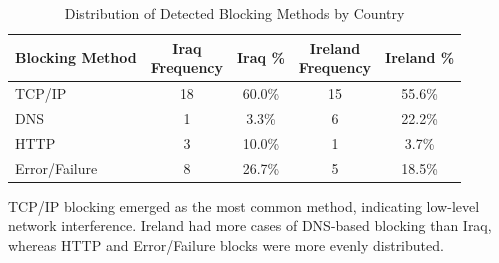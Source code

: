 \vspace{2em}

\begin{table}[H] 
\centering 
\caption{Distribution of Detected Blocking Methods by Country} 
\begin{tabular}{lcccc} 
\toprule 
\textbf{Blocking Method} & \shortstack{\textbf{Iraq} \\ \textbf{Frequency}} & \textbf{Iraq \%} & \shortstack{\textbf{Ireland} \\ \textbf{Frequency}} & \textbf{Ireland \%} \\
\midrule 
TCP/IP         & 18 & 60.0\%  & 15 & 55.6\% \\
DNS            & 1  & 3.3\%   & 6  & 22.2\% \\
HTTP           & 3  & 10.0\%  & 1  & 3.7\% \\
Error/Failure  & 8  & 26.7\%  & 5  & 18.5\% \\
\bottomrule 
\end{tabular} 
\label{tab:blocking_methods_comparison} 
\end{table}

TCP/IP blocking emerged as the most common method, indicating low-level network interference. Ireland had more cases of DNS-based blocking than Iraq, whereas HTTP and Error/Failure blocks were more evenly distributed.

\vspace{2em}

